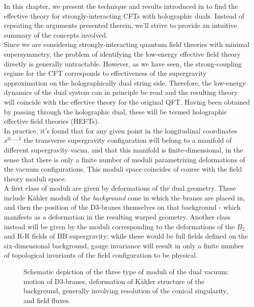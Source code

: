 
In this chapter, we present the technique and results introduced in \cite{MZ} to find the effective theory for strongly-interacting CFTs with holographic duals. Instead of repeating the arguments presented therein, we'll strive to provide an intuitive summary of the concepts involved.\\

Since we are considering strongly-interacting quantum field theories with minimal supersymmetry, the problem of identifying the low-energy effective field theory directly is generally untractable. However, as we have seen, the strong-coupling regime for the CFT corresponds to effectiveness of the supergravity approximation on the holographically dual string side. Therefore, the low-energy dynamics of the dual system can in principle be read and the resulting theory will coincide with the effective theory for the original QFT. Having been obtained by passing through the holographic dual, these will be termed holographic effective field theories (HEFTs).\\

In practice, it's found that for any given point in the longitudinal coordinates $x^{0,\ldots,3}$ the transverse supergravity configuration will belong to a manifold of different supergravity vacua, and that this manifold is finite-dimensional, in the sense that there is only a finite number of moduli parametrizing deformations of the vacuum configurations. This moduli space coincides of course with the field theory moduli space.\\

A first class of moduli are given by deformations of the dual geometry. These include K\"ahler moduli of the \emph{background} cone in which the branes are placed in, and then the position of the D3-branes themselves on that background - which manifests as a deformation in the resulting warped geometry. Another class instead will be given by the moduli corresponding to the deformations of the $B_2$ and R-R fields of IIB supergravity; while these would be full fields defined on the six-dimensional background, gauge invariance will result in only a finite number of topological invariants of the field configuration to be physical.\\


\begin{figure}
\centering
\def\svgwidth{200pt}

\caption{Schematic depiction of the three type of moduli of the dual vacuum: motion of D3-branes, deformation of K\"ahler structure of the background, generally involving resolution of the conical singularity, and field fluxes.}
\end{figure}


